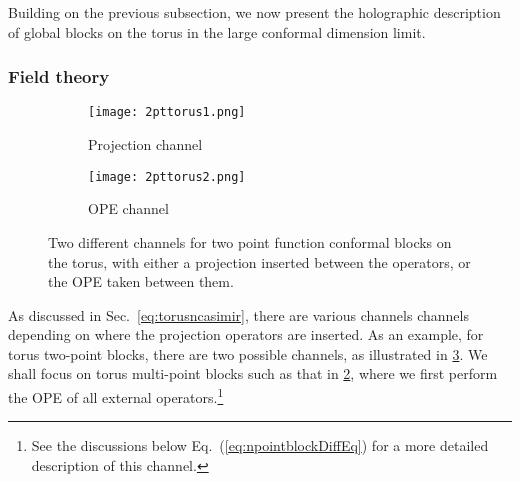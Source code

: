 \documentclass[12pt]{article}
\begin{document}
Building on the previous subsection, we now present the holographic description of global blocks on the torus in the large conformal dimension limit.

\subsubsection{Field theory}

 \begin{figure}
 \centering
	\begin{subfigure}[b]{.4\textwidth}\centering
	 \texttt{[image: 2pttorus1.png]}
	 \caption{Projection channel\label{ProjChan}}
	\end{subfigure}
	\begin{subfigure}[b]{.4\textwidth}\centering
	 \texttt{[image: 2pttorus2.png]}
	\caption{OPE channel\label{OPEChan}}
	\end{subfigure}
\caption{\label{Torus2pt}Two different channels for two point function conformal blocks on the torus, with either a projection inserted between the operators, or the OPE taken between them.}
 \end{figure}

As discussed in Sec.~\ref{eq:torusncasimir}, there are various channels channels depending on where the projection operators are inserted.
As an example, for torus two-point blocks, there are two possible channels, as illustrated in \cref{Torus2pt}.
We shall focus on torus multi-point blocks  such as that  in \cref{OPEChan}, where we first perform the OPE of all external operators.\footnote{See the discussions below Eq.~(\ref{eq:npointblockDiffEq}) for a more detailed description of this channel.}
\end{document}
